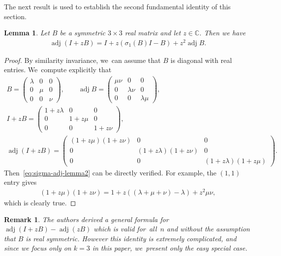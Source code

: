 \documentclass[pdftex]{sigma}
\def\C{\mathbb{C}}
\def\adj{\operatorname{adj}}
\newtheorem{Lemma}[Theorem]{Lemma}
\newtheorem{Remark}[Theorem]{Remark}}
\numberwithin{equation}{section}
\begin{document}
The next result is used to establish the second fundamental identity of this section.
\begin{Lemma} \label{lemma:sigma-adj-2}
Let $B$ be a symmetric $3 \times 3$ real matrix and let $z \in \C$. Then we have
\begin{gather} \label{eq:sigma-adj-lemma2}
\adj(I + z B) = I + z( \sigma_1(B) I - B) + z^2 \adj B.
\end{gather}
\end{Lemma}
\begin{proof}
By similarity invariance, we~can assume that $B$ is diagonal with real entries. We~compute explicitly that
\begin{gather*}
B = \begin{pmatrix} \lambda & 0 & 0 \\ 0 & \mu & 0 \\ 0 & 0 & \nu \end{pmatrix} , \qquad \adj B = \begin{pmatrix} \mu \nu & 0 & 0 \\ 0 & \lambda \nu & 0 \\ 0 & 0 & \lambda \mu \end{pmatrix} ,
\\[1ex]
I + z B = \begin{pmatrix} 1 + z \lambda & 0 & 0 \\ 0 & 1 + z \mu & 0 \\ 0 & 0 & 1 + z \nu \end{pmatrix} ,
\\[1ex]
\adj(I + z B) = \begin{pmatrix} (1 + z \mu) (1 + z \nu) & 0 & 0 \\ 0 & (1 + z \lambda) (1 + z \nu) & 0 \\ 0 & 0 & (1 + z \lambda) (1 + z \mu) \end{pmatrix} .
\end{gather*}
Then~\eqref{eq:sigma-adj-lemma2} can be directly verified. For example, the $(1,1)$ entry gives
\begin{gather*}
 (1 + z \mu) (1 + z \nu) = 1 + z ( (\lambda + \mu + \nu) - \lambda) + z^2 \mu \nu,
 \end{gather*}
which is clearly true.
\end{proof}

\begin{Remark} \label{rmk:adjugate-identity}
The authors derived a general formula for $\adj(I + z B) - \adj (z B)$ which is valid for~all~$n$ and without the assumption that $B$ is real symmetric. However this identity is extremely complicated, and since we focus only on $k=3$ in this paper, we~present only the easy special case.
\end{Remark}
\end{document}

